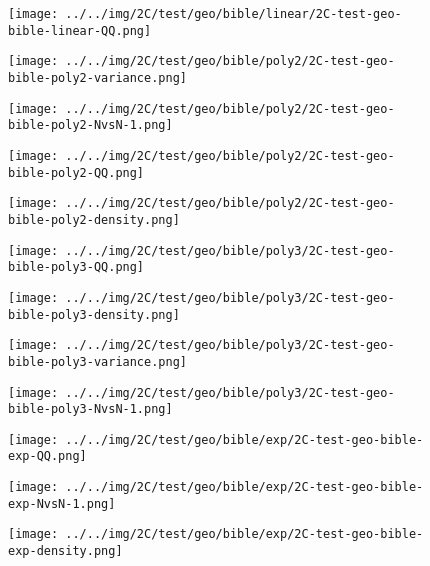 \begin{figure}[H]
\centering	\texttt{[image: ../../img/2C/test/geo/bible/linear/2C-test-geo-bible-linear-QQ.png]}
\end{figure}
\begin{figure}[H]
\centering	\texttt{[image: ../../img/2C/test/geo/bible/poly2/2C-test-geo-bible-poly2-variance.png]}
\end{figure}
\begin{figure}[H]
\centering	\texttt{[image: ../../img/2C/test/geo/bible/poly2/2C-test-geo-bible-poly2-NvsN-1.png]}
\end{figure}
\begin{figure}[H]
\centering	\texttt{[image: ../../img/2C/test/geo/bible/poly2/2C-test-geo-bible-poly2-QQ.png]}
\end{figure}
\begin{figure}[H]
\centering	\texttt{[image: ../../img/2C/test/geo/bible/poly2/2C-test-geo-bible-poly2-density.png]}
\end{figure}
\begin{figure}[H]
\centering	\texttt{[image: ../../img/2C/test/geo/bible/poly3/2C-test-geo-bible-poly3-QQ.png]}
\end{figure}
\begin{figure}[H]
\centering	\texttt{[image: ../../img/2C/test/geo/bible/poly3/2C-test-geo-bible-poly3-density.png]}
\end{figure}
\begin{figure}[H]
\centering	\texttt{[image: ../../img/2C/test/geo/bible/poly3/2C-test-geo-bible-poly3-variance.png]}
\end{figure}
\begin{figure}[H]
\centering	\texttt{[image: ../../img/2C/test/geo/bible/poly3/2C-test-geo-bible-poly3-NvsN-1.png]}
\end{figure}
\begin{figure}[H]
\centering	\texttt{[image: ../../img/2C/test/geo/bible/exp/2C-test-geo-bible-exp-QQ.png]}
\end{figure}
\begin{figure}[H]
\centering	\texttt{[image: ../../img/2C/test/geo/bible/exp/2C-test-geo-bible-exp-NvsN-1.png]}
\end{figure}
\begin{figure}[H]
\centering	\texttt{[image: ../../img/2C/test/geo/bible/exp/2C-test-geo-bible-exp-density.png]}
\end{figure}
